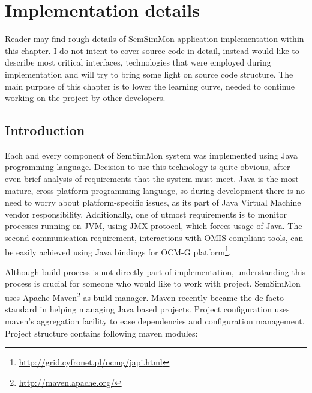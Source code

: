 %
\chapter{Implementation details}
\label{cha:implementation}

\parbox{0.8\textwidth}{

{\small
Reader may find rough details of SemSimMon application implementation within this chapter. I do not intent to cover source code in detail, instead would like to describe most critical interfaces, technologies that were employed during implementation and will try to bring some light on source code structure. The main purpose of this chapter is to lower the learning curve, needed to continue working on the project by other developers.
}
}


\section{Introduction}

Each and every component of SemSimMon system was implemented using Java programming language. Decision to use this technology is quite obvious, after even brief analysis of requirements that the system must meet. Java is the most mature, cross platform programming language, so during development there is no need to worry about platform-specific issues, as its part of Java Virtual Machine vendor responsibility. Additionally, one of utmost requirements is to monitor processes running on JVM, using JMX protocol, which forces usage of Java. The second communication requirement, interactions with OMIS compliant tools, can be easily achieved using Java bindings for OCM-G platform\footnote{\url{http://grid.cyfronet.pl/ocmg/japi.html}}.

Although build process is not directly part of implementation, understanding this process is crucial for someone who would like to work with project. SemSimMon uses Apache Maven\footnote{\url{http://maven.apache.org/}} as build manager. Maven recently became the de facto standard in helping managing Java based projects. Project configuration uses maven's aggregation facility to ease dependencies and configuration management. Project structure contains following maven modules: 

